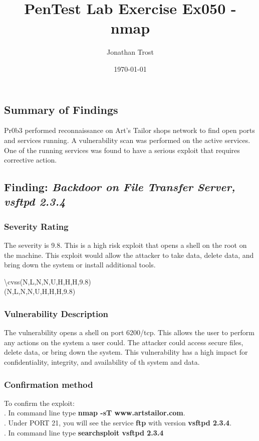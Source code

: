 \documentclass[notitlepage]{article}
\begin{document}
	
	
	\title{PenTest Lab Exercise Ex050 - nmap}
	\author{Jonathan Trost}
	\date{\isodate\today}
	
	\maketitle
	
	\tableofcontents
	
	\newpage
	
	\subsection{Summary of Findings}
	\indent Pr0b3 performed reconnaissance on Art's Tailor shops network to find open ports and services running. A vulnerability scan was performed on the active services. One of the running services was found to have a  serious exploit that requires corrective action.  
	
	\subsection{Finding: \emph{Backdoor on File Transfer Server, vsftpd 2.3.4}}
	
	\subsubsection{Severity Rating}
	The severity is 9.8. This is a high risk exploit that opens a shell on the root on the machine.  This exploit would allow the attacker to take data, delete data, and bring down the system or install additional tools.  

	\textbackslash cvss(N,L,N,N,U,H,H,H,9.8)\\
	\cvss(N,L,N,N,U,H,H,H,9.8) \\
	
	\subsubsection{Vulnerability Description}
	The vulnerability opens a shell on port 6200/tcp. This allows the user to perform any actions on the system a user could. The attacker could access secure files, delete data, or bring down the system. This vulnerability has a high impact for confidentiality, integrity, and availability of th system and data. 
	
	\subsubsection{Confirmation method}
	To confirm the exploit: \\
	. In command line type \textbf{nmap -sT www.artstailor.com}.\\
	. Under PORT 21, you will see the service \textbf{ftp} with version \textbf{vsftpd 2.3.4}. \\
	. In command line type \textbf{searchsploit vsftpd 2.3.4} \\
	
\end{document}
